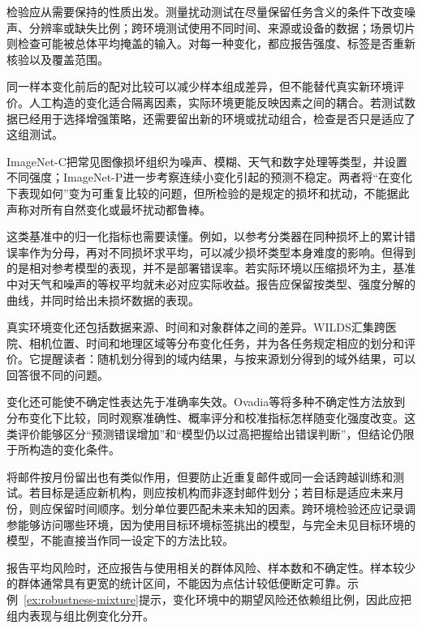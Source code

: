检验应从需要保持的性质出发。测量扰动测试在尽量保留任务含义的条件下改变噪声、分辨率或缺失比例；跨环境测试使用不同时间、来源或设备的数据；场景切片则检查可能被总体平均掩盖的输入。对每一种变化，都应报告强度、标签是否重新核验以及覆盖范围。

同一样本变化前后的配对比较可以减少样本组成差异，但不能替代真实新环境评价。人工构造的变化适合隔离因素，实际环境更能反映因素之间的耦合。若测试数据已经用于选择增强策略，还需要留出新的环境或扰动组合，检查是否只是适应了这组测试。

ImageNet-C把常见图像损坏组织为噪声、模糊、天气和数字处理等类型，并设置不同强度；ImageNet-P进一步考察连续小变化引起的预测不稳定。两者将“在变化下表现如何”变为可重复比较的问题，但所检验的是规定的损坏和扰动，不能据此声称对所有自然变化或最坏扰动都鲁棒。

这类基准中的归一化指标也需要读懂。例如，以参考分类器在同种损坏上的累计错误率作为分母，再对不同损坏求平均，可以减少损坏类型本身难度的影响。但得到的是相对参考模型的表现，并不是部署错误率。若实际环境以压缩损坏为主，基准中对天气和噪声的等权平均就未必对应实际收益。报告应保留按类型、强度分解的曲线，并同时给出未损坏数据的表现。

真实环境变化还包括数据来源、时间和对象群体之间的差异。WILDS汇集跨医院、相机位置、时间和地理区域等分布变化任务，并为各任务规定相应的划分和评价。它提醒读者：随机划分得到的域内结果，与按来源划分得到的域外结果，可以回答很不同的问题。

\Needspace{45mm}
变化还可能使不确定性表达先于准确率失效。Ovadia等将多种不确定性方法放到分布变化下比较，同时观察准确性、概率评分和校准指标怎样随变化强度改变。这类评价能够区分“预测错误增加”和“模型仍以过高把握给出错误判断”，但结论仍限于所构造的变化条件。

将邮件按月份留出也有类似作用，但要防止近重复邮件或同一会话跨越训练和测试。若目标是适应新机构，则应按机构而非逐封邮件划分；若目标是适应未来月份，则应保留时间顺序。划分单位要匹配未来未知的因素。跨环境检验还应记录调参能够访问哪些环境，因为使用目标环境标签挑出的模型，与完全未见目标环境的模型，不能直接当作同一设定下的方法比较。

报告平均风险时，还应报告与使用相关的群体风险、样本数和不确定性。样本较少的群体通常具有更宽的统计区间，不能因为点估计较低便断定可靠。示例~\ref{ex:robustness-mixture}提示，变化环境中的期望风险还依赖组比例，因此应把组内表现与组比例变化分开。

